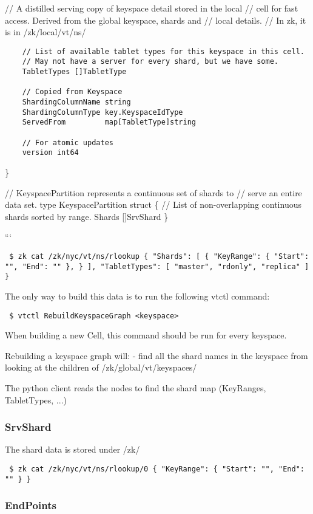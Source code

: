 // A distilled serving copy of keyspace detail stored in the local
// cell for fast access. Derived from the global keyspace, shards and
// local details.
// In zk, it is in /zk/local/vt/ns/

\begin{verbatim}    // List of available tablet types for this keyspace in this cell.
    // May not have a server for every shard, but we have some.
    TabletTypes []TabletType

    // Copied from Keyspace
    ShardingColumnName string
    ShardingColumnType key.KeyspaceIdType
    ServedFrom         map[TabletType]string

    // For atomic updates
    version int64
\end{verbatim}
\}

// KeyspacePartition represents a continuous set of shards to
// serve an entire data set.
type KeyspacePartition struct \{
        // List of non-overlapping continuous shards sorted by range.
        Shards []SrvShard
\}

```

{\tt 
\$ zk cat /zk/nyc/vt/ns/rlookup
\{
  "Shards": [
    \{
      "KeyRange": \{
        "Start": "",
        "End": ""
      \},
    \}
  ],
  "TabletTypes": [
    "master",
    "rdonly",
    "replica"
  ]
\}
}

The only way to build this data is to run the following vtctl command:

{\tt 
\$ vtctl RebuildKeyspaceGraph \textless{}keyspace\textgreater{}
}

When building a new Cell, this command should be run for every keyspace.

Rebuilding a keyspace graph will:
- find all the shard names in the keyspace from looking at the children of /zk/global/vt/keyspaces/

The python client reads the nodes to find the shard map (KeyRanges, TabletTypes, ...)

\subsubsection{SrvShard}\hypertarget{srvshard}{}\label{srvshard}

The shard data is stored under /zk/

{\tt 
\$ zk cat /zk/nyc/vt/ns/rlookup/0
\{
  "KeyRange": \{
    "Start": "",
    "End": ""
  \}
\}
}

\subsubsection{EndPoints}\hypertarget{endpoints}{}\label{endpoints}

